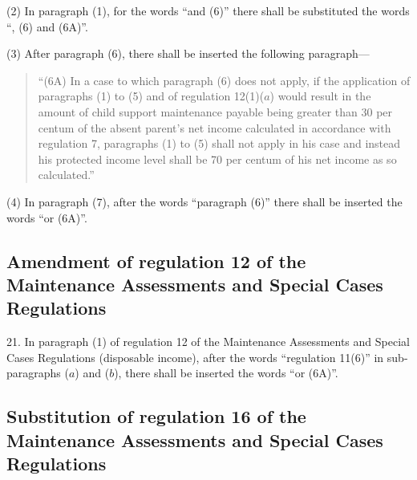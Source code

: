 \documentclass[12pt,a4paper]{article}
\begin{document}
(2) In paragraph (1), for the words “and (6)” there shall be substituted the words “, (6) and (6A)”.

(3) After paragraph (6), there shall be inserted the following paragraph—
\begin{quotation}
“(6A) In a case to which paragraph (6) does not apply, if the application of paragraphs (1) to (5) and of regulation 12(1)($a$) would result in the amount of child support maintenance payable being greater than 30 per centum of the absent parent’s net income calculated in accordance with regulation 7, paragraphs (1) to (5) shall not apply in his case and instead his protected income level shall be 70 per centum of his net income as so calculated.”
\end{quotation}

(4) In paragraph (7), after the words “paragraph (6)” there shall be inserted the words “or (6A)”.

\subsection[21. Amendment of regulation 12 of the Maintenance Assessments and Special Cases Regulations]{Amendment of regulation 12 of the Maintenance Assessments and Special Cases Regulations}

21.  In paragraph (1) of regulation 12 of the Maintenance Assessments and Special Cases Regulations (disposable income), after the words “regulation 11(6)” in sub-paragraphs ($a$) and ($b$), there shall be inserted the words “or (6A)”.

\subsection[22. Substitution of regulation 16 of the Maintenance Assessments and Special Cases Regulations]{Substitution of regulation 16 of the Maintenance Assessments and Special Cases Regulations}
\end{document}
